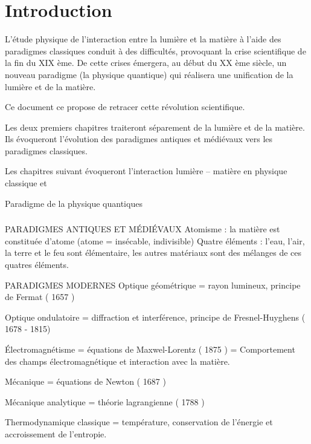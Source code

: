 \chapter{Introduction}


L'étude physique de l'interaction entre la lumière et la matière à l'aide des paradigmes classiques conduit à des difficultés, provoquant la crise scientifique de la fin du XIX ème. De cette crises émergera, au début du XX ème siècle, un nouveau paradigme (la physique quantique) qui réalisera une unification de la lumière et de la matière.

Ce document ce propose de retracer cette révolution scientifique.

Les deux premiers chapitres traiteront séparement de la lumière et de la matière. Ils évoqueront l'évolution des paradigmes antiques et médiévaux vers les paradigmes classiques.

Les chapitres suivant évoqueront l'interaction lumière -- matière en physique classique et 

Paradigme de la physique quantiques

\subsection{}\subsection{}
\begin{center}
\end{center}

PARADIGMES ANTIQUES ET MÉDIÉVAUX
	Atomisme : la matière est constituée d'atome (atome = insécable, indivisible)
	Quatre éléments : l'eau, l'air, la terre et le feu sont élémentaire, les autres matériaux sont des mélanges de ces quatres éléments.

PARADIGMES MODERNES
	Optique géométrique = rayon lumineux, principe de Fermat ( 1657 )

	Optique ondulatoire = diffraction et interférence, principe de Fresnel-Huyghens ( 1678 - 1815)

	Électromagnétisme =  équations de Maxwel-Lorentz ( 1875 ) = Comportement des champs électromagnétique et interaction avec la matière.

	Mécanique = équations de Newton ( 1687 )

	Mécanique analytique = théorie lagrangienne ( 1788 )

	Thermodynamique classique = température, conservation de l'énergie et accroissement de l'entropie.

